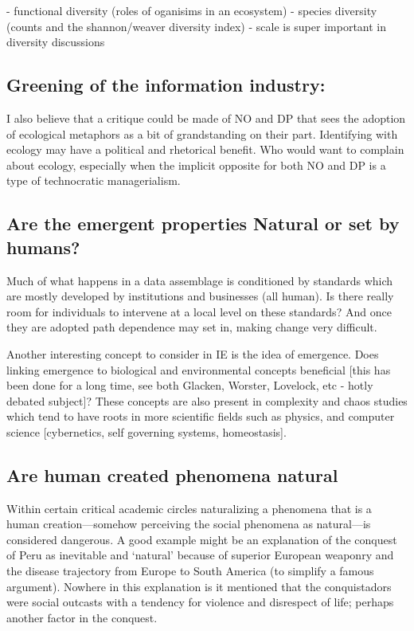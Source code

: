 - functional diversity (roles of oganisims in an ecosystem)
- species diversity (counts and the shannon/weaver diversity index)
- scale is super important in diversity discussions

\subsection{Greening of the information industry:}

I also believe that a critique could be made of NO and DP that sees the adoption of ecological metaphors as a bit of grandstanding on their part. Identifying with ecology may have a political and rhetorical benefit. Who would want to complain about ecology, especially when the implicit opposite for both NO and DP is a type of technocratic managerialism.

\subsection{Are the emergent properties Natural or set by humans?}

Much of what happens in a data assemblage is conditioned by standards which are mostly developed by institutions and businesses (all human). Is there really room for individuals to intervene at a local level on these standards? And once they are adopted path dependence may set in, making change very difficult.

Another interesting concept to consider in IE is the idea of emergence. Does linking emergence to biological and environmental concepts beneficial [this has been done for a long time, see both Glacken, Worster, Lovelock, etc - hotly debated subject]? These concepts are also present in complexity and chaos studies which tend to have roots in more scientific fields such as physics, and computer science [cybernetics, self governing systems, homeostasis].

\subsection{Are human created phenomena natural}

Within certain critical academic circles naturalizing a phenomena that is a human creation—somehow perceiving the social phenomena as natural—is considered dangerous. A good example might be an explanation of the conquest of Peru as inevitable and ‘natural’ because of superior European weaponry and the disease trajectory from Europe to South America (to simplify a famous argument). Nowhere in this explanation is it mentioned that the conquistadors were social outcasts with a tendency for violence and disrespect of life; perhaps another factor in the conquest. 


